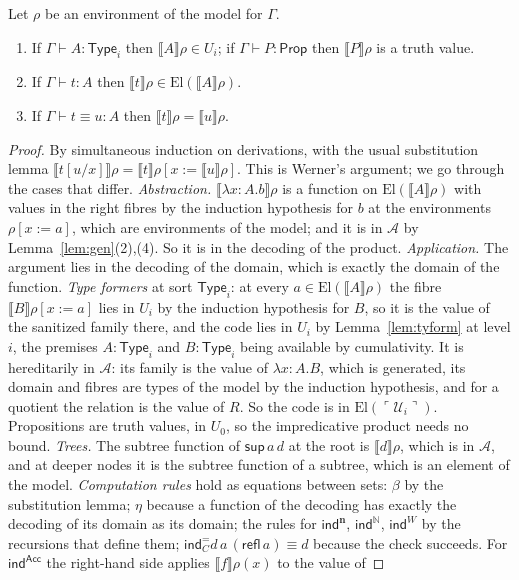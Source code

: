 \documentclass[10pt]{article}
\newcommand{\N}{\mathbb{N}}
\newcommand{\Prop}{\mathsf{Prop}}
\newcommand{\Type}{\mathsf{Type}}
\newcommand{\sem}[1]{\llbracket #1\rrbracket}
\newcommand{\El}{\mathrm{El}}
\newcommand{\code}[1]{\ulcorner #1\urcorner}
\newcommand{\U}{\mathcal{U}}
\newcommand{\A}{\mathcal{A}}
\newcommand{\ind}{\mathsf{ind}}
\newcommand{\Acc}{\mathsf{Acc}}
\newcommand{\refl}{\mathsf{refl}}
\begin{document}
\begin{lemma}[soundness]\label{lem:sound}
Let $\rho$ be an environment of the model for $\Gamma$.
\begin{enumerate}
\item If $\Gamma\vdash A:\Type_i$ then $\sem A\rho\in U_i$; if
  $\Gamma\vdash P:\Prop$ then $\sem P\rho$ is a truth value.
\item If $\Gamma\vdash t:A$ then $\sem t\rho\in\El(\sem A\rho)$.
\item If $\Gamma\vdash t\equiv u:A$ then $\sem t\rho=\sem u\rho$.
\end{enumerate}
\end{lemma}
\begin{proof}
By simultaneous induction on derivations, with the usual substitution
lemma $\sem{t[u/x]}\rho=\sem t\rho[x{:=}\sem u\rho]$. This is Werner's
argument; we go through the cases that differ.
\emph{Abstraction.} $\sem{\lambda x{:}A.b}\rho$ is a function on
$\El(\sem A\rho)$ with values in the right fibres by the induction
hypothesis for $b$ at the environments $\rho[x{:=}a]$, which are
environments of the model; and it is in $\A$ by
Lemma~\ref{lem:gen}(2),(4). So it is in the decoding of the product.
\emph{Application.} The argument lies in the decoding of the domain,
which is exactly the domain of the function.
\emph{Type formers} at sort $\Type_i$: at every $a\in\El(\sem A\rho)$ the
fibre $\sem B\rho[x{:=}a]$ lies in $U_i$ by the induction hypothesis for
$B$, so it is the value of the sanitized family there, and the code
lies in $U_i$ by Lemma~\ref{lem:tyform} at level $i$, the premises
$A:\Type_i$ and $B:\Type_i$ being available by cumulativity. It is
hereditarily in $\A$: its family is the value of $\lambda x{:}A.B$, which
is generated, its domain and fibres are types of the model by the
induction hypothesis, and for a quotient the relation is the value of
$R$. So the code is in $\El(\code{\U_i})$. Propositions
are truth values, in $U_0$, so the impredicative product needs no bound.
\emph{Trees.} The subtree function of $\mathsf{sup}\,a\,d$ at the root is
$\sem d\rho$, which is in $\A$, and at deeper nodes it is the subtree
function of a subtree, which is an element of the model.
\emph{Computation rules} hold as equations between sets: $\beta$ by the
substitution lemma; $\eta$ because a function of the decoding has
exactly the decoding of its domain as its domain; the rules for
$\ind^{\mathbf n}$, $\ind^\N$, $\ind^W$ by the recursions that define
them; $\ind^=_Cd\,a\,(\refl\,a)\equiv d$ because the check succeeds. For
$\ind^{\Acc}$ the right-hand side applies $\sem f\rho(x)$ to the value of

\end{proof}
\end{document}
